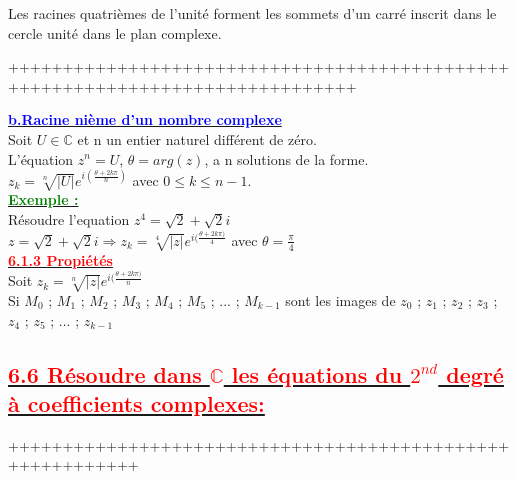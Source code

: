 \documentclass[12pt]{article}
\newcounter{exemple} %
\newcommand{\exemple}{%
  \refstepcounter{exemple}%
  \textbf{\textcolor{green}{Exemple \theexemple :}} \ignorespaces
}
\begin{document}
\begin{center}
\end{center}

Les racines quatrièmes de l'unité forment les sommets d'un carré inscrit dans le cercle unité dans le plan complexe.

++++++++++++++++++++++++++++++++++++++++++++++++++++++++++++++++++++++++++++++

\underline{\textbf{\textcolor{blue}{b.Racine nième d'un nombre complexe}}}\\
Soit $U \in \mathbb{C}$ et n un entier naturel différent de zéro.\\
L'équation $z^{n}=U$, $\theta=arg(z)$, a n solutions de la forme.\\
$z_{k}=\sqrt[n]{|U|}e^{i(\frac{\theta+2k\pi}{n})}$ avec $ 0\leq k \leq n-1 $.\\
\underline{\exemple}\\
Résoudre l'equation $z^{4}=\sqrt{2}+\sqrt{2}i$\\
$z=\sqrt{2}+\sqrt{2}i \Longrightarrow z_{k}=\sqrt[4]{|z|}e^{i(\frac{\theta+2k\pi)}{4}}$ avec 
$\theta=\frac{\pi}{4}$\\
\underline{\textbf{\textcolor{red}{6.1.3 Propiétés}}}\\
Soit $z_{k}=\sqrt[n]{|z|}e^{i(\frac{\theta+2k\pi)}{n}}$\\
Si $M_{0}$ ; $M_{1}$ ; $M_{2}$ ; $M_{3}$ ; $M_{4}$ ; $M_{5}$ ; ... ; $M_{k-1}$ sont les images de $z_{0}$ ; $z_{1}$ ; $z_{2}$ ; $z_{3}$ ; $z_{4}$ ; $z_{5}$ ; ... ; $z_{k-1}$
\subsection*{\underline{\textbf{\textcolor{red}{6.6 Résoudre dans $\mathbb{C}$ les équations du $2^{nd}$ degré à coefficients complexes:}}}}
++++++++++++++++++++++++++++++++++++++++++++++++++++++++++
\end{document}
